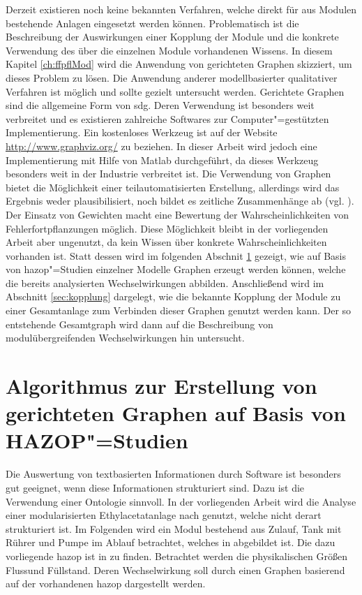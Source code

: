 Derzeit existieren noch keine bekannten Verfahren, welche direkt f\"ur aus Modulen bestehende Anlagen eingesetzt werden k\"onnen. Problematisch ist die Beschreibung der Auswirkungen einer Kopplung der Module und die konkrete Verwendung des \"uber die einzelnen Module vorhandenen Wissens. In diesem Kapitel \ref{ch:ffpflMod} wird die Anwendung von gerichteten Graphen skizziert, um dieses Problem zu l\"osen. Die Anwendung anderer modellbasierter qualitativer Verfahren ist m\"oglich und sollte gezielt untersucht werden. Gerichtete Graphen sind die allgemeine Form von \ac{sdg}. Deren Verwendung ist besonders weit verbreitet und es existieren zahlreiche Softwares zur Computer"=gest\"utzten Implementierung. Ein kostenloses Werkzeug ist auf der Website \url{http://www.graphviz.org/} zu beziehen. In dieser Arbeit wird jedoch eine Implementierung mit Hilfe von Matlab durchgef\"uhrt, da dieses Werkzeug besonders weit in der Industrie verbreitet ist. \newline
Die Verwendung von Graphen bietet die M\"oglichkeit einer teilautomatisierten Erstellung, allerdings wird das Ergebnis weder plausibilisiert, noch bildet es zeitliche Zusammenh\"ange ab {(vgl. \cite{Yang_2010})}. Der Einsatz von Gewichten macht eine Bewertung der Wahrscheinlichkeiten von Fehlerfortpflanzungen m\"oglich. Diese M\"oglichkeit bleibt in der vorliegenden Arbeit aber ungenutzt, da kein Wissen \"uber konkrete Wahrscheinlichkeiten vorhanden ist. Statt dessen wird im folgenden Abschnit \ref{sec:graphHazop} gezeigt, wie auf Basis von \ac{hazop}"=Studien einzelner Modelle Graphen erzeugt werden k\"onnen, welche die bereits analysierten Wechselwirkungen abbilden. Anschlie\ss{}end wird im Abschnitt \ref{sec:kopplung} dargelegt, wie die bekannte Kopplung der Module zu einer Gesamtanlage zum Verbinden dieser Graphen genutzt werden kann. Der so entstehende Gesamtgraph wird dann auf die Beschreibung von modul\"ubergreifenden Wechselwirkungen hin untersucht. 

\section{Algorithmus zur Erstellung von gerichteten Graphen auf Basis von HAZOP"=Studien}\label{sec:graphHazop}
Die Auswertung von textbasierten Informationen durch Software ist besonders gut geeignet, wenn diese Informationen strukturiert sind. Dazu ist die Verwendung einer Ontologie sinnvoll. In der vorliegenden Arbeit wird die Analyse einer modularisierten Ethylacetatanlage nach \cite{Pfeffer_2016, Pfeffer_2017} genutzt, welche nicht derart strukturiert ist. Im Folgenden wird ein Modul bestehend aus Zulauf, Tank mit R\"uhrer und Pumpe im Ablauf betrachtet, welches in  abgebildet ist. Die dazu vorliegende \ac{hazop} ist in  zu finden. Betrachtet werden die physikalischen Gr\"o\ss{}en \glqq Fluss\grqq { }und \glqq F\"ullstand\grqq . Deren Wechselwirkung soll durch einen Graphen basierend auf der vorhandenen \ac{hazop} dargestellt werden.  

